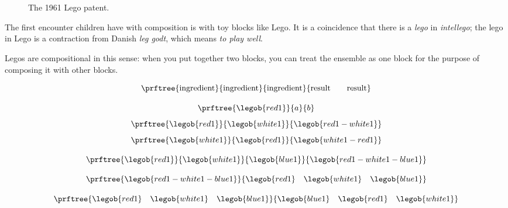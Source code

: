 


\section{}

\begin{figure*}[p]
  \centering
%
  \caption{The 1961 Lego patent.}
\end{figure*}

The first encounter children have with composition is with toy blocks like Lego. It is a coincidence that there is a \emph{lego} in \emph{intellego};
the lego in Lego is a contraction from Danish \emph{leg godt}, which means \emph{to play well}.

Legos are compositional in this sense: when you put together two blocks, you can treat the ensemble as one block for the purpose of composing it with other blocks.


\begin{equation}
\prftree{
    \text{ingredient}
}{
    \text{ingredient}
}{
    \text{ingredient}
}{
    \text{result} \quad \quad \text{result}
}
\end{equation}

\begin{equation}
\prftree{\legob{red1}}{a}{b}
\end{equation}
\begin{equation}
\prftree{\legob{red1}}{\legob{white1}}{\legob{red1-white1}}
\end{equation}
%
\begin{equation}
\prftree{\legob{white1}}{\legob{red1}}{\legob{white1-red1}}
\end{equation}

\begin{equation}
\prftree{\legob{red1}}{\legob{white1}}{\legob{blue1}}{\legob{red1-white1-blue1}}
\end{equation}

\begin{equation}
\prftree{\legob{red1-white1-blue1}}{\legob{red1}\quad\legob{white1}\quad \legob{blue1} }
\end{equation}


\begin{equation}
\prftree{\legob{red1}\quad\legob{white1}\quad \legob{blue1}}{\legob{blue1}\quad\legob{red1}\quad \legob{white1} }
\end{equation}


